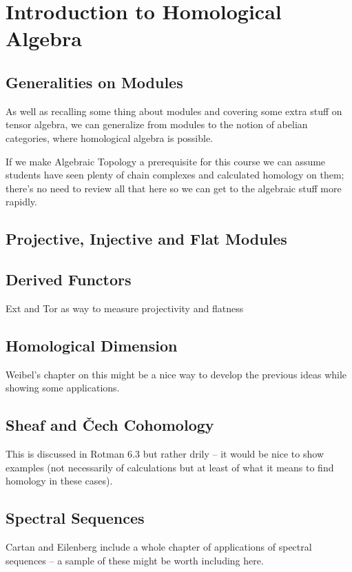\documentclass[oneside,english]{amsbook}
\numberwithin{section}{chapter}
\theoremstyle{plain}
\theoremstyle{definition}
\providecommand{\Cech}{\v{C}ech }
\begin{document}
	\part{Introduction to Homological Algebra}
	
	\chapter{Generalities on Modules}
	
	As well as recalling some thing about modules and covering some extra stuff on tensor algebra, we can generalize from modules to the notion of abelian categories, where homological algebra is possible.
	
	If we make Algebraic Topology a prerequisite for this course we can assume students have seen plenty of chain complexes and calculated homology on them; there's no need to review all that here so we can get to the algebraic stuff more rapidly.
	
	\chapter{Projective, Injective and Flat Modules}
	
	\chapter{Derived Functors}
	
	Ext and Tor as way to measure projectivity and flatness
	
	\chapter{Homological Dimension}
	
	Weibel's chapter on this might be a nice way to develop the previous ideas while showing some applications.
	
	\chapter{Sheaf and \Cech Cohomology}
	
	This is discussed in Rotman 6.3 but rather drily -- it would be nice to show examples (not necessarily of calculations but at least of what it means to find homology in these cases).

	\chapter{Spectral Sequences}
	
	Cartan and Eilenberg include a whole chapter of applications of spectral sequences -- a sample of these might be worth including here.
\end{document}
